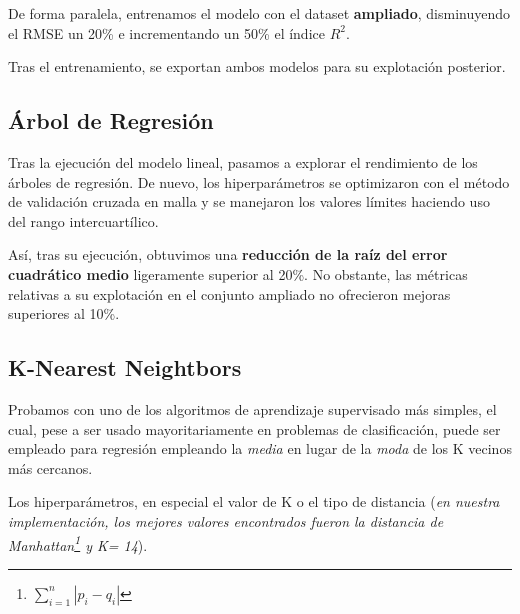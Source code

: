 
De forma paralela, entrenamos el modelo con el dataset \textbf{ampliado}, disminuyendo el RMSE un 20\% e incrementando un 50\% el índice $R^{2}$.

Tras el entrenamiento, se exportan ambos modelos para su explotación posterior.


\subsection{Árbol de Regresión}

Tras la ejecución del modelo lineal, pasamos a explorar el rendimiento de los árboles de regresión.
De nuevo, los hiperparámetros se optimizaron con el método de validación cruzada en malla y se manejaron los valores límites haciendo uso del rango intercuartílico.

Así, tras su ejecución, obtuvimos una \textbf{reducción de la raíz del error cuadrático medio} ligeramente superior al 20\%. No obstante, las métricas relativas a su explotación en el conjunto ampliado no ofrecieron mejoras superiores al 10\%.



\subsection{K-Nearest Neightbors}

Probamos con uno de los algoritmos de aprendizaje supervisado más simples, el cual, pese a ser usado mayoritariamente en problemas de clasificación, puede ser empleado para regresión empleando la \textit{media} en lugar de la \textit{moda} de los K vecinos más cercanos.

Los hiperparámetros, en especial el valor de K o el tipo de distancia (\textit{en nuestra implementación, los mejores valores encontrados fueron la distancia de Manhattan\footnote{\(\sum_{i=1}^{n} |p_{i} - q_{i}|\)} y K= 14}).






 